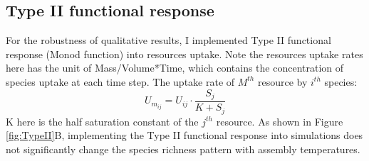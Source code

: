 \subsection{Type II functional response}

For the robustness of qualitative results, I implemented Type II functional response (Monod function) into resources uptake. Note the resources uptake rates here has the unit of Mass/Volume*Time, which contains the concentration of species uptake at each time step. The uptake rate of $M^{th}$ resource by $i^{th}$ species: 
\begin{equation*}
    U_{m_{ij}} = U_{ij}\cdot\frac{S_j}{K+S_j}
\end{equation*}
K here is the half saturation constant of the $j^{th}$ resource. As shown in Figure \ref{fig:TypeII}B, implementing the Type II functional response into simulations does not significantly change the species richness pattern with assembly temperatures. 

